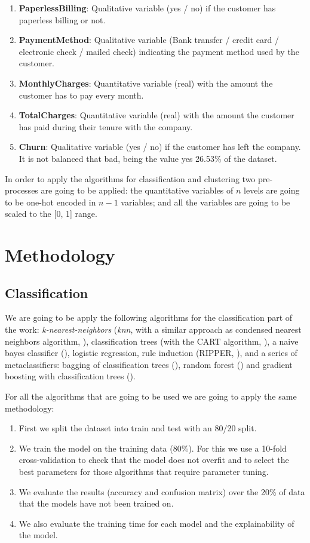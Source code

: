 \documentclass[a4paper,11pt]{article}
\begin{document}
\begin{enumerate}
	\item \textbf{PaperlessBilling}: Qualitative variable (yes / no) if the customer has paperless billing or not.
	\item \textbf{PaymentMethod}: Qualitative variable (Bank transfer / credit card / electronic check / mailed check) indicating the payment method used by the customer.
	\item \textbf{MonthlyCharges}: Quantitative variable (real) with the amount the customer has to pay every month.
	\item \textbf{TotalCharges}: Quantitative variable (real) with the amount the customer has paid during their tenure with the company.
	\item \textbf{Churn}: Qualitative variable (yes / no) if the customer has left the company. It is not balanced that bad, being the value yes 26.53\% of the dataset.
\end{enumerate}

In order to apply the algorithms for classification and clustering two pre-processes are going to be applied: the quantitative variables of $n$ levels are going to be one-hot encoded in $n-1$ variables; and all the variables are going to be scaled to the [0, 1] range.

\section{Methodology}

\subsection{Classification}

We are going to be apply the following algorithms for the classification part of the work: \textit{k-nearest-neighbors} (\textit{knn}, with a similar approach as condensed nearest neighbors algorithm, \cite{hart1968}), classification trees (with the CART algorithm, \cite{breiman1984}), a naive bayes classifier (\cite{minsky1961}), logistic regression, rule induction (RIPPER, \cite{cohen1995}), and a series of metaclassifiers: bagging of classification trees (\cite{breiman1996}), random forest (\cite{breiman2001}) and gradient boosting with classification trees (\cite{freund1997}).

For all the algorithms that are going to be used we are going to apply the same methodology:

\begin{enumerate}
	\item First we split the dataset into train and test with an 80/20 split.
	\item We train the model on the training data (80\%). For this we use a 10-fold cross-validation to check that the model does not overfit and to select the best parameters for those algorithms that require parameter tuning.
	\item We evaluate the results (accuracy and confusion matrix) over the 20\% of data that the models have not been trained on.
	\item We also evaluate the training time for each model and the explainability of the model.
\end{enumerate}
\end{document}
